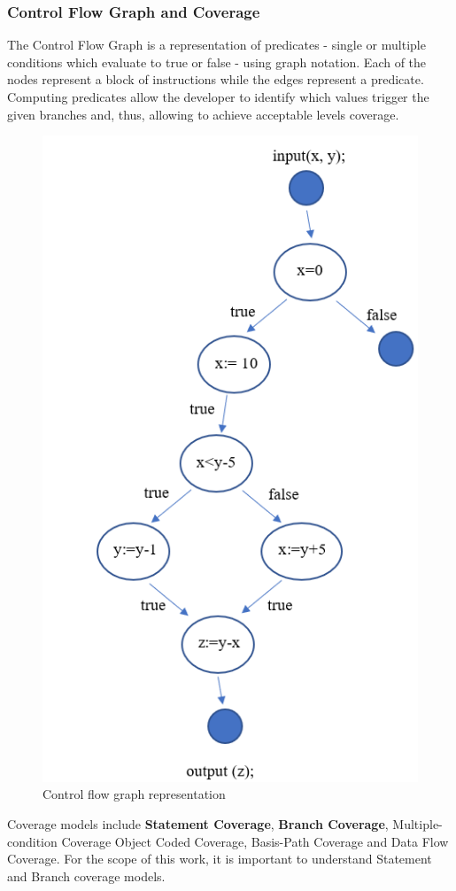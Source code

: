 \documentclass{sigchi}
\begin{document}
\subsubsection{Control Flow Graph and Coverage}
The Control Flow Graph is a representation of predicates - single or multiple conditions which evaluate to true or false - using graph notation. Each of the nodes represent a block of instructions while the edges represent a predicate. Computing predicates allow the developer to identify which values trigger the given branches and, thus, allowing to achieve acceptable levels coverage.
\begin{figure}[h!]
    \centering
	\includegraphics[width=0.9\columnwidth]{cfg}
    \caption {Control flow graph representation}
    \label{fig:cfg}
\end{figure}
Coverage models include \textbf{Statement Coverage}, \textbf{Branch Coverage}, Multiple-condition Coverage Object Coded Coverage, Basis-Path Coverage and Data Flow Coverage. For the scope of this work, it is important to understand Statement and Branch coverage models.
\end{document}
